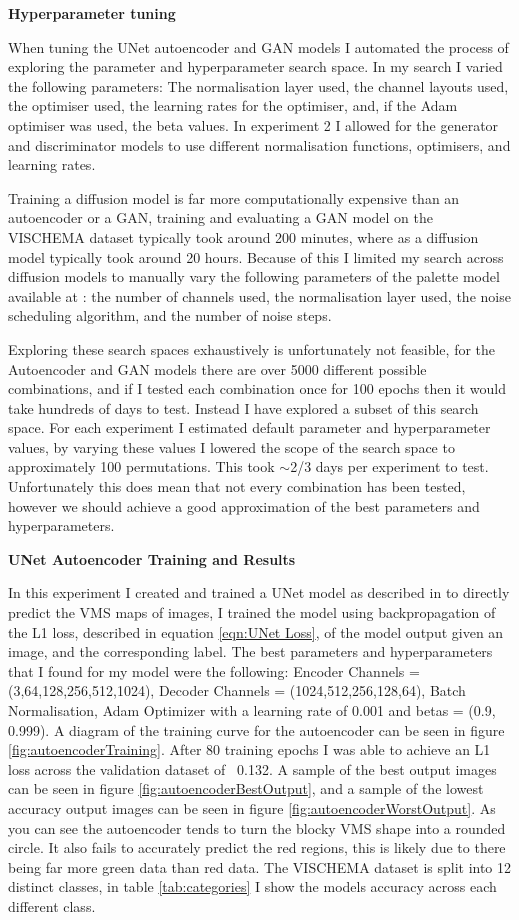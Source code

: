 \documentclass{UoYCSproject}
\begin{document}
\textbf{Hyperparameter tuning}

When tuning the UNet autoencoder and GAN models I automated the process of exploring the parameter and hyperparameter search space. In my search I varied the following parameters: The normalisation layer used, the channel layouts used, the optimiser used, the learning rates for the optimiser, and, if the Adam optimiser was used, the beta values. In experiment 2 I allowed for the generator and discriminator models to use different normalisation functions, optimisers, and learning rates. 

Training a diffusion model is far more computationally expensive than an autoencoder or a GAN, training and evaluating a GAN model on the VISCHEMA dataset typically took around 200 minutes, where as a diffusion model typically took around 20 hours. 
Because of this I limited my search across diffusion models to manually vary the following parameters of the palette model available at \cite{JanspiryPalette}: the number of channels used, the normalisation layer used, the noise scheduling algorithm, and the number of noise steps.

Exploring these search spaces exhaustively is unfortunately not feasible, for the Autoencoder and GAN models there are over 5000 different possible combinations, and if I tested each combination once for 100 epochs then it would take hundreds of days to test.
Instead I have explored a subset of this search space. For each experiment I estimated default parameter and hyperparameter values, by varying these values I lowered the scope of the search space to approximately 100 permutations. This took \(\sim\)2/3 days per experiment to test. Unfortunately this does mean that not every combination has been tested, however we should achieve a good approximation of the best parameters and hyperparameters.

\textbf{UNet Autoencoder Training and Results}

In this experiment I created and trained a UNet model as described in \cite{ronneberger2015unet} to directly predict the VMS maps of images, I trained the model using backpropagation of the L1 loss, described in equation \ref{eqn:UNet Loss}, of the model output given an image, and the corresponding label. The best parameters and hyperparameters that I found for my model were the following: Encoder Channels = (3,64,128,256,512,1024), Decoder Channels = (1024,512,256,128,64), Batch Normalisation, Adam Optimizer with a learning rate of 0.001 and betas = (0.9, 0.999). A diagram of the training curve for the autoencoder can be seen in figure \ref{fig:autoencoderTraining}. After 80 training epochs I was able to achieve an L1 loss across the validation dataset of ~0.132. A sample of the best output images can be seen in figure \ref{fig:autoencoderBestOutput}, and a sample of the lowest accuracy output images can be seen in figure \ref{fig:autoencoderWorstOutput}. As you can see the autoencoder tends to turn the blocky VMS shape into a rounded circle. It also fails to accurately predict the red regions, this is likely due to there being far more green data than red data. The VISCHEMA dataset is split into 12 distinct classes, in table \ref{tab:categories} I show the models accuracy across each different class.
\end{document}
